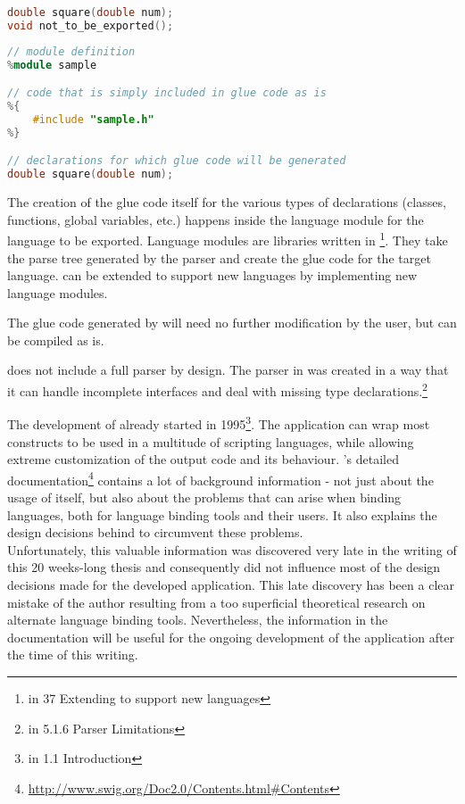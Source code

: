 \SingleSpacing
\begin{lstlisting}[language=C++, caption=Original header file: sample.h]
double square(double num);
void not_to_be_exported();
\end{lstlisting}
\OnehalfSpacing

\SingleSpacing
\begin{lstlisting}[language=C++, caption=According \myProperName{SWIG} interface file]
// module definition
%module sample

// code that is simply included in glue code as is
%{
    #include "sample.h"
%}

// declarations for which glue code will be generated
double square(double num);
\end{lstlisting}
\OnehalfSpacing

The creation of the glue code itself for the various types of declarations (classes, functions, global variables, etc.) happens inside the language module for the language to be exported. Language modules are libraries written in \footnote{\citep{SWIGHPDoc} in 37 Extending  to support new languages}. They take the parse tree generated by the  parser and create the glue code for the target language.  can be extended to support new languages by implementing new language modules.

The glue code generated by  will need no further modification by the user, but can be compiled as is.

 does not include a full  parser by design. The parser in  was created in a way that it can handle incomplete interfaces and deal with missing type declarations.\footnote{\citep{SWIGHPDoc} in 5.1.6 Parser Limitations}

The development of  already started in 1995\footnote{\citep{SWIGHPDoc} in 1.1 Introduction}. The application can wrap most  constructs to be used in a multitude of scripting languages, while allowing extreme customization of the output code and its behaviour. 's detailed documentation\footnote{\url{http://www.swig.org/Doc2.0/Contents.html\#Contents}} contains a lot of background information - not just about the usage of  itself, but also about the problems that can arise when binding languages, both for language binding tools and their users. It also explains the design decisions behind  to circumvent these problems.
\\Unfortunately, this valuable information was discovered very late in the writing of this 20 weeks-long thesis and consequently did not influence most of the design decisions made for the developed application. This late discovery has been a clear mistake of the author resulting from a too superficial theoretical research on alternate language binding tools. Nevertheless, the information in the documentation will be useful for the ongoing development of the application after the time of this writing.

